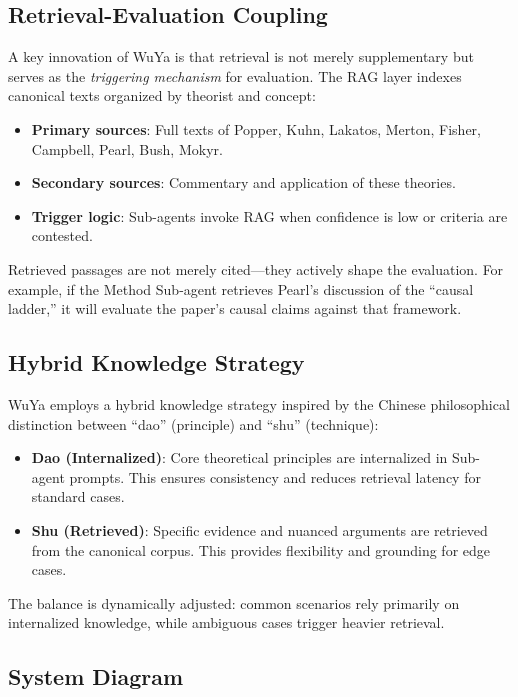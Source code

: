 \documentclass[11pt,a4paper]{article}
\begin{document}
\subsection{Retrieval-Evaluation Coupling}

A key innovation of WuYa is that retrieval is not merely supplementary but serves as the \textit{triggering mechanism} for evaluation. The RAG layer indexes canonical texts organized by theorist and concept:

\begin{itemize}
    \item \textbf{Primary sources}: Full texts of Popper, Kuhn, Lakatos, Merton, Fisher, Campbell, Pearl, Bush, Mokyr.
    \item \textbf{Secondary sources}: Commentary and application of these theories.
    \item \textbf{Trigger logic}: Sub-agents invoke RAG when confidence is low or criteria are contested.
\end{itemize}

Retrieved passages are not merely cited---they actively shape the evaluation. For example, if the Method Sub-agent retrieves Pearl's discussion of the ``causal ladder,'' it will evaluate the paper's causal claims against that framework.

\subsection{Hybrid Knowledge Strategy}

WuYa employs a hybrid knowledge strategy inspired by the Chinese philosophical distinction between ``dao'' (principle) and ``shu'' (technique):

\begin{itemize}
    \item \textbf{Dao (Internalized)}: Core theoretical principles are internalized in Sub-agent prompts. This ensures consistency and reduces retrieval latency for standard cases.
    \item \textbf{Shu (Retrieved)}: Specific evidence and nuanced arguments are retrieved from the canonical corpus. This provides flexibility and grounding for edge cases.
\end{itemize}

The balance is dynamically adjusted: common scenarios rely primarily on internalized knowledge, while ambiguous cases trigger heavier retrieval.

\subsection{System Diagram}
\end{document}
